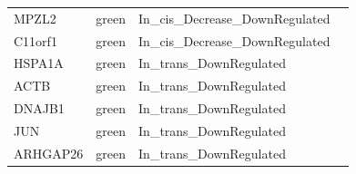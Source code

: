 \begin{table}[htbp]
\begin{tabular}{|l|l|l|r}
     MPZL2 & green & In\_cis\_Decrease\_DownRegulated  \\
     C11orf1 & green & In\_cis\_Decrease\_DownRegulated   \\
     HSPA1A & green & In\_trans\_DownRegulated  \\
     ACTB & green & In\_trans\_DownRegulated  \\
     DNAJB1 & green & In\_trans\_DownRegulated   \\
     JUN & green & In\_trans\_DownRegulated   \\
     ARHGAP26 & green & In\_trans\_DownRegulated  \\
       \hline
     \end{tabular}%
   \label{tab:SA1035downregulatedgenesinclusters}%
 \end{table}%

